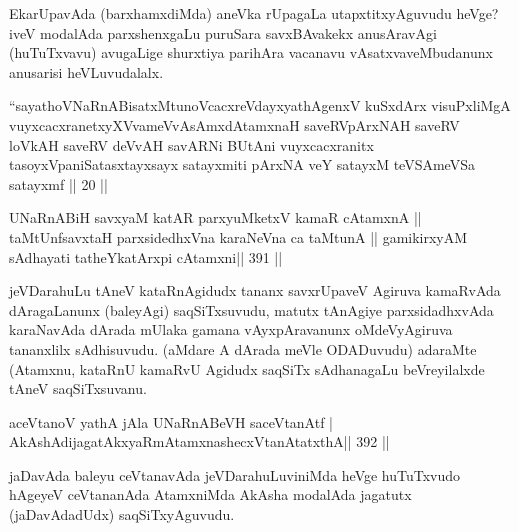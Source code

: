 \begin{artha}
EkarUpavAda (barxhamxdiMda) aneVka rUpagaLa utapxtitxyAguvudu heVge?  \mdash  iveV modalAda parxshenxgaLu puruSara savxBAvakekx anusAravAgi (huTuTxvavu) avugaLige shurxtiya parihAra vacanavu vAsatxvaveMbudanunx anusarisi heVLuvudalalx.
\end{artha}


\begin{kandikeshl}
``sayathoVNaRnABisatxMtunoVcacxreVdayxyathAgenxV 
kuSxdArx visuPxliMgA vuyxcacxranetxyXVvameVvAsAmxdAtamxnaH 
saveRVpArxNAH saveRV loVkAH saveRV deVvAH savARNi
BUtAni vuyxcacxranitx tasoyxVpaniSatasxtayxsayx
satayxmiti pArxNA veY satayxM teVSAmeVSa satayxmf || 20 ||
\end{kandikeshl}

\begin{center}
\end{center}

\begin{shl}
UNaRnABiH savxyaM katAR parxyuMketxV kamaR cA\s\s tamxnA ||
taMtUnfsavxtaH parxsidedhxVna karaNeVna ca taMtunA ||
gamikirxyAM sAdhayati tatheYkatArxpi cA\s\s tamxni\hfill || 391 ||
\end{shl}

\begin{artha}
jeVDarahuLu tAneV kataRnAgidudx tananx savxrUpaveV Agiruva kamaRvAda  dAragaLanunx  (baleyAgi) saqSiTxsuvudu, matutx tAnAgiye parxsidadhxvAda  karaNavAda dArada mUlaka gamana vAyxpAravanunx oMdeVyAgiruva tananxlilx  sAdhisuvudu. (aMdare A dArada meVle ODADuvudu) adaraMte (Atamxnu, kataRnU kamaRvU Agidudx saqSiTx sAdhanagaLu beVreyilalxde tAneV saqSiTxsuvanu.
\end{artha}


\begin{shl}
aceVtanoV yathA jAla UNaRnABeVH saceVtanAtf |
AkAshAdijagatAkxyaRmAtamxnashecxVtanAtatxthA\hfill || 392 ||
\end{shl}

\begin{artha}
jaDavAda baleyu ceVtanavAda jeVDarahuLuviniMda heVge huTuTxvudo hAgeyeV ceVtananAda AtamxniMda AkAsha modalAda jagatutx (jaDavAdadUdx) saqSiTxyAguvudu.
\end{artha}

